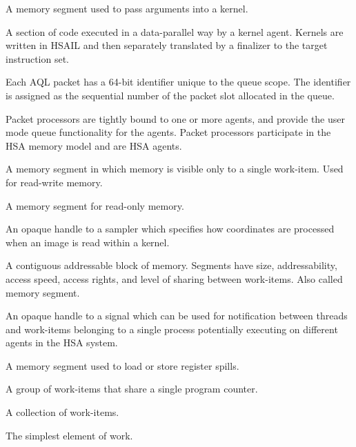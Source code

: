 \documentclass[final,oneside]{book}
\begin{document}
\begin{description}[itemsep=5pt,leftmargin=0cm, labelindent=0cm]
\item[Kernarg segment] A memory segment used to pass arguments into a kernel.

\item[Kernel] A section of code executed in a data-parallel way by a kernel
  agent. Kernels are written in HSAIL and then separately translated by a
  finalizer to the target instruction set.

\item[Packet ID] Each AQL packet has a 64-bit identifier unique to the queue
  scope. The identifier is assigned as the sequential number of the packet slot
  allocated in the queue.

\item[Packet processor] Packet processors are tightly bound to one or more
  agents, and provide the user mode queue functionality for the agents. Packet
  processors participate in the HSA memory model and are HSA agents.

\item[Private segment] A memory segment in which memory is visible only to a
  single work-item. Used for read-write memory.

\item[Readonly segment] A memory segment for read-only memory.

\item[Sampler handle] An opaque handle to a sampler which specifies how
  coordinates are processed when an image is read within a kernel.

\item[Segment] A contiguous addressable block of memory. Segments have size,
  addressability, access speed, access rights, and level of sharing between
  work-items. Also called memory segment.

\item[Signal (handle)] An opaque handle to a signal which can be used for
  notification between threads and work-items belonging to a single process
  potentially executing on different agents in the HSA system.

\item[Spill segment] A memory segment used to load or store register spills.

\item[Wavefront] A group of work-items that share a single program counter.

\item[Work-group] A collection of work-items.

\item[Work-item] The simplest element of work.

\end{description}
\end{document}
